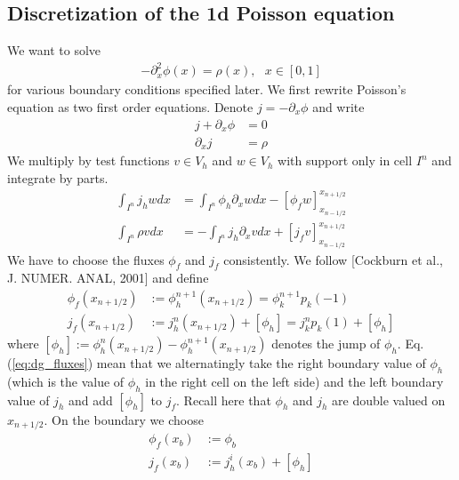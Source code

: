 \documentclass[a4paper,12pt]{scrartcl}
\begin{document}
\subsection{Discretization of the 1d Poisson equation}
We want to solve 
\begin{align}
    -\partial_x^2\phi(x) = \rho(x), \ \ \ x\in [0,1]
    \label{eq:1d_poisson}
\end{align}
for various boundary conditions specified later.
We first rewrite Poisson's equation as two first order equations.
Denote $j = -\partial_x \phi$ and write
\begin{subequations}
\begin{align}
    j + \partial_x \phi &= 0\\
    \partial_x j &= \rho 
    \label{eq:poisson}
\end{align}
\end{subequations}
We multiply by test functions $v \in V_h$ and $w \in V_h$ with 
support only in cell $I^n$ and 
integrate by parts.
\begin{subequations}
    \begin{align}
        \int_{I^n} j_h w dx &= \int_{I^n}\phi_h\partial_x w dx - [\phi_f w]_{x_{n-1/2}}^{x_{n+1/2}} \\
        \int_{I^n} \rho v dx &= -\int_{I^n} j_h\partial_x v dx + [j_f v]_{x_{n-1/2}}^{x_{n+1/2}}
    \end{align}
    \label{eq:dg_poisson}
\end{subequations}
We have to choose the fluxes $\phi_f$ and $j_f$ consistently.
We follow [Cockburn et al., J. NUMER. ANAL, 2001] and define
\begin{subequations}
\begin{align}
    \phi_f(x_{n+1/2}) &:= \phi_h^{n+1}(x_{n+1/2}) = \phi^{n+1}_kp_k(-1) \\
    j_f(x_{n+1/2}) &:= j_h^n(x_{n+1/2}) + [\phi_h] = j^n_kp_k(1) + [\phi_h] 
    \label{eq:dg_fluxes}
\end{align}
\end{subequations} 
where $[\phi_h] := \phi_h^n(x_{n+1/2})-\phi_h^{n+1}(x_{n+1/2})$ denotes
the jump of $\phi_h$. Eq. (\ref{eq:dg_fluxes}) mean that we alternatingly 
take the right boundary value of $\phi_h$ (which is the value of $\phi_h$ in 
the right cell on the left side) and 
the left boundary value of $j_h$ and add $[\phi_h]$ to $j_f$. 
Recall here that $\phi_h$ and $j_h$ are 
double valued on $x_{n+1/2}$.
On the boundary we choose
\begin{subequations}
    \begin{align}
        \phi_f(x_b) &:= \phi_b \\
        j_f(x_b) &:= j_h^i(x_b) + [\phi_h]
        \label{ eq:dg_dirichlet_boundary_fluxes}
    \end{align}
\end{subequations}
\end{document}
